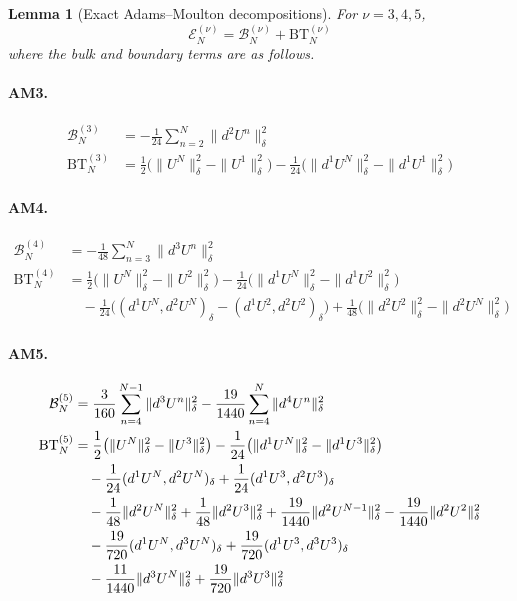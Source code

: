 \documentclass[10pt,a4paper]{amsart}
\newtheorem{lem}{Lemma}
\begin{document}
\begin{lem}[Exact Adams--Moulton decompositions]
\label{lem:adams-exact-energy-decompositions}
For \(\nu=3,4,5\),
\begin{equation}
\mathcal E_N^{(\nu)}=\mathcal B_N^{(\nu)}+\mathrm{BT}_N^{(\nu)} \label{eq:adams-bulk-boundary-decomposition}
\end{equation}
where the bulk and boundary terms are as follows.

\paragraph{AM3.}
\begin{align}
\mathcal B_N^{(3)}
&=-\frac1{24}\sum_{n=2}^N\|d^2U^n\|_{\delta}^2 \label{eq:am3-energy-bulk}\\
\mathrm{BT}_N^{(3)}
&=\frac12\bigl(\|U^N\|_{\delta}^2-\|U^1\|_{\delta}^2\bigr)
-\frac1{24}\bigl(\|d^1U^N\|_{\delta}^2
-\|d^1U^1\|_{\delta}^2\bigr) \label{eq:am3-energy-boundary}
\end{align}

\paragraph{AM4.}
\begin{align}
\mathcal B_N^{(4)}
&=-\frac1{48}\sum_{n=3}^N\|d^3U^n\|_{\delta}^2 \label{eq:am4-energy-bulk}\\
\mathrm{BT}_N^{(4)}
&=\frac12\bigl(\|U^N\|_{\delta}^2-\|U^2\|_{\delta}^2\bigr)
-\frac1{24}\bigl(\|d^1U^N\|_{\delta}^2
-\|d^1U^2\|_{\delta}^2\bigr) \label{eq:am4-energy-boundary-main}\\
&\quad-\frac1{24}\bigl((d^1U^N,d^2U^N)_{\delta}
-(d^1U^2,d^2U^2)_{\delta}\bigr)
+\frac1{48}\bigl(\|d^2U^2\|_{\delta}^2
-\|d^2U^N\|_{\delta}^2\bigr) \label{eq:am4-energy-boundary-increments}
\end{align}

\paragraph{AM5.}
\begin{align}
\mathcal B_N^{(5)}
&=\frac3{160}\sum_{n=4}^{N-1}\|d^3U^n\|_{\delta}^2
-\frac{19}{1440}\sum_{n=4}^{N}\|d^4U^n\|_{\delta}^2 \label{eq:am5-energy-bulk}\\
\mathrm{BT}_N^{(5)}
&=\frac12\bigl(\|U^N\|_{\delta}^2-\|U^3\|_{\delta}^2\bigr)
-\frac1{24}\bigl(\|d^1U^N\|_{\delta}^2
-\|d^1U^3\|_{\delta}^2\bigr) \label{eq:am5-energy-boundary-main}\\
&\quad-\frac1{24}(d^1U^N,d^2U^N)_{\delta}
+\frac1{24}(d^1U^3,d^2U^3)_{\delta} \notag\\
&\quad-\frac1{48}\|d^2U^N\|_{\delta}^2
+\frac1{48}\|d^2U^3\|_{\delta}^2
+\frac{19}{1440}\|d^2U^{N-1}\|_{\delta}^2
-\frac{19}{1440}\|d^2U^2\|_{\delta}^2 \notag\\
&\quad-\frac{19}{720}(d^1U^N,d^3U^N)_{\delta}
+\frac{19}{720}(d^1U^3,d^3U^3)_{\delta} \notag\\
&\quad-\frac{11}{1440}\|d^3U^N\|_{\delta}^2
+\frac{19}{720}\|d^3U^3\|_{\delta}^2 \label{eq:am5-energy-boundary-increments}
\end{align}
\end{lem}
\end{document}
